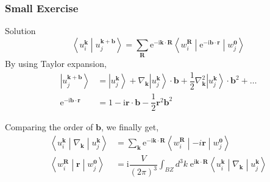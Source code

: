 \documentclass{beamer}
\begin{document}
  \begin{frame}
    \frametitle{Small Exercise}

    \begin{block}{Solution}
      \small 
      \begin{equation*}
        \left\langle{}u_i^{\mathbf{k}}\middle|{}u_j^{\mathbf{k}+\mathbf{b}}\right\rangle = \sum_{\mathbf{R}}\mathrm{e}^{-\mathrm{i}\mathbf{k}\cdot\mathbf{R}}\left\langle{}w_i^{\mathbf{R}}\middle|\mathrm{e}^{-\mathrm{i}\mathbf{b}\cdot\mathbf{r}}\middle|{}w_j^{\mathbf{0}}\right\rangle
      \end{equation*}
      By using Taylor expansion,
      \begin{equation*}
        \begin{aligned}
          \left|u_j^{\mathbf{k}+\mathbf{b}}\right\rangle &= \left|u_j^{\mathbf{k}}\right\rangle + \nabla_\mathbf{k}\left|u_j^{\mathbf{k}}\right\rangle\cdot\mathbf{b} + \dfrac{1}{2}\nabla^2_\mathbf{k}\left|u_j^{\mathbf{k}}\right\rangle\cdot\mathbf{b}^2 + \ldots\\
          \mathrm{e}^{-\mathrm{i}\mathbf{b}\cdot\mathbf{r}} &= 1 - \mathrm{i}\mathbf{r}\cdot\mathbf{b} - \dfrac{1}{2}\mathbf{r}^2\mathbf{b}^2
        \end{aligned}
      \end{equation*}

      Comparing the order of \(\mathbf{b}\), we finally get, 
      \begin{subequations}
        \begin{align}
          \left\langle{}u_i^{\mathbf{k}}\middle|\nabla_\mathbf{k}\middle|u_j^{\mathbf{k}}\right\rangle &= \sum_{\mathbf{k}}\mathrm{e}^{-\mathrm{i}\mathbf{k}\cdot\mathbf{R}}\left\langle{}w_i^{\mathbf{R}}\middle|-i\mathbf{r}\middle|{}w_j^{\mathbf{0}}\right\rangle\\
          \left\langle{}w_i^{\mathbf{R}}\middle|\mathbf{r}\middle|{}w_j^{\mathbf{0}}\right\rangle &= \mathrm{i}\dfrac{V}{(2\pi)^3}\int_{BZ}d^3k\; \mathrm{e}^{\mathrm{i}\mathbf{k}\cdot\mathbf{R}}\left\langle{}u_i^{\mathbf{k}}\middle|\nabla_\mathbf{k}\middle|u_j^{\mathbf{k}}\right\rangle
        \end{align}
      \end{subequations}

    \end{block}

    \end{frame}
\end{document}
